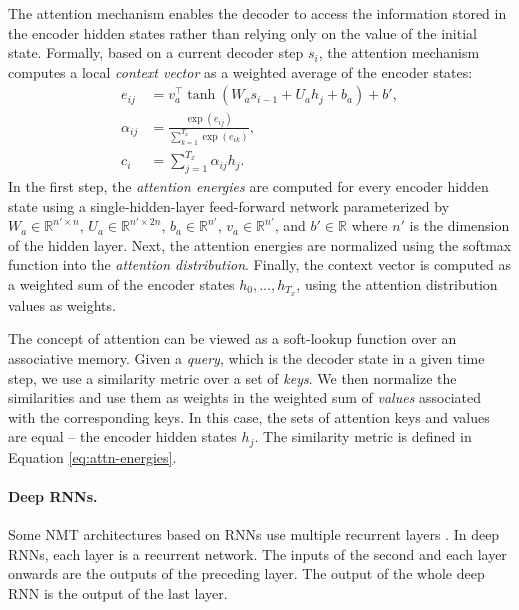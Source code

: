 The attention mechanism enables the decoder to access the information stored in
the encoder hidden states rather than relying only on the value of the initial
state.  Formally, based on a current decoder step $s_i$, the attention mechanism
computes a local \emph{context vector} as a weighted average of the encoder
states:
%
\begin{align}
  e_{ij} &= v_a^\top \tanh (W_a s_{i-1} + U_a h_j + b_a) + b', \label{eq:attn-energies} \\
  \alpha_{ij} &= \frac{\exp(e_{ij})}{\sum_{k=1}^{T_x}\exp(e_{ik})}, \\
  c_i &= \sum_{j=1}^{T_x} \alpha_{ij} h_j.
\end{align}
%
In the first step, the \emph{attention energies} are computed for every encoder
hidden state using a single-hidden-layer feed-forward network parameterized by
$W_a \in \mathbb{R}^{n' \times n}$, $U_a \in \mathbb{R}^{n' \times 2n}$,
$b_a \in \mathbb{R}^{n'}$, $v_a \in \mathbb{R}^{n'}$, and $b' \in \mathbb{R}$
where $n'$ is the dimension of the hidden layer. Next, the attention energies
are normalized using the softmax function into the \emph{attention
  distribution}.  Finally, the context vector is computed as a weighted sum of
the encoder states $h_0,\ldots, h_{T_x}$, using the attention distribution
values as weights.

The concept of attention can be viewed as a soft-lookup function over an
associative memory. Given a \emph{query}, which is the decoder state in a given
time step, we use a similarity metric over a set of \emph{keys}. We then
normalize the similarities and use them as weights in the weighted sum of
\emph{values} associated with the corresponding keys. In this case, the sets of
attention keys and values are equal -- the encoder hidden states $h_j$. The
similarity metric is defined in Equation \ref{eq:attn-energies}.

\paragraph{Deep RNNs.} Some NMT architectures based on RNNs use multiple
recurrent layers \citep{barone2017deep,wu2016google}. In deep RNNs, each layer
is a recurrent network. The inputs of the second and each layer onwards are the
outputs of the preceding layer. The output of the whole deep RNN is the output
of the last layer.

